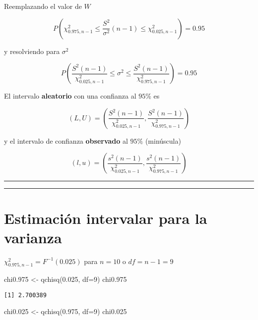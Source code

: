 \documentclass[
]{book}
\newenvironment{Shaded}{\begin{snugshade}}{\end{snugshade}}
\newcommand{\AttributeTok}[1]{\textcolor[rgb]{0.77,0.63,0.00}{#1}}
\newcommand{\DecValTok}[1]{\textcolor[rgb]{0.00,0.00,0.81}{#1}}
\newcommand{\FloatTok}[1]{\textcolor[rgb]{0.00,0.00,0.81}{#1}}
\newcommand{\FunctionTok}[1]{\textcolor[rgb]{0.00,0.00,0.00}{#1}}
\newcommand{\NormalTok}[1]{#1}
\newcommand{\OtherTok}[1]{\textcolor[rgb]{0.56,0.35,0.01}{#1}}
\begin{document}
Reemplazando el valor de \(W\)

\[P(\chi^2_{0.975,n-1} \leq \frac{S^2}{\sigma^2}(n-1) \leq \chi^2_{0.025,n-1})= 0.95\]

y resolviendo para \(\sigma^2\)

\[P(\frac{S^2 (n-1)}{\chi^2_{0.025,n-1}}\leq \sigma^2 \leq \frac{S^2(n-1)}{ \chi^2_{0.975,n-1}})=0.95\]

El intervalo \textbf{aleatorio} con una confianza al \(95\%\) es

\[(L,U) = (\frac{S^2 (n-1)}{\chi^2_{0.025,n-1}},\frac{S^2(n-1)}{\chi ^2_{0.975,n-1}})\]

y el intervalo de confianza \textbf{observado} al \(95\%\) (minúscula)

\[(l,u) = (\frac{s^2 (n-1)}{\chi^2_{0.025,n-1}},\frac{s^2(n-1)}{\chi ^2_{0.975,n-1}})\]

\begin{center}\rule{0.5\linewidth}{0.5pt}\end{center}

\begin{center}\rule{0.5\linewidth}{0.5pt}\end{center}

\hypertarget{estimaciuxf3n-intervalar-para-la-varianza-3}{%
\section{Estimación intervalar para la varianza}\label{estimaciuxf3n-intervalar-para-la-varianza-3}}

\(\chi^2_{0.975,n-1}=F^{-1}(0.025)\)
para \(n=10\) o \(df=n-1=9\)

\begin{Shaded}
\begin{Highlighting}[]
\NormalTok{chi0}\FloatTok{.975} \OtherTok{\textless{}{-}} \FunctionTok{qchisq}\NormalTok{(}\FloatTok{0.025}\NormalTok{, }\AttributeTok{df=}\DecValTok{9}\NormalTok{)}
\NormalTok{chi0}\FloatTok{.975}
\end{Highlighting}
\end{Shaded}

\begin{verbatim}
[1] 2.700389
\end{verbatim}

\begin{Shaded}
\begin{Highlighting}[]
\NormalTok{chi0}\FloatTok{.025} \OtherTok{\textless{}{-}} \FunctionTok{qchisq}\NormalTok{(}\FloatTok{0.975}\NormalTok{, }\AttributeTok{df=}\DecValTok{9}\NormalTok{)}
\NormalTok{chi0}\FloatTok{.025}
\end{Highlighting}
\end{Shaded}
\end{document}

